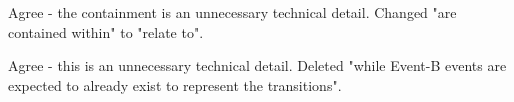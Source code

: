 \documentclass{response}
\begin{document}
\begin{comment}{Reviewer \#3}
  Page 2:
  
  * Second paragraph appears complicated writing.
\end{comment}

\begin{response}
\end{response}

\begin{comment}{Reviewer \#3}
  Page 3:

* Listing 1: I think I would name that variable "run2completion" differently.
\end{comment}

\begin{response}
\end{response}


\begin{comment}{Reviewer \#3}
  Page 4:

  * Mid, it is not clear what this means:

  "The diagrammatic models are contained within an Event-B machine"
\end{comment}

\begin{response}
	Agree - the containment is an unnecessary technical detail. Changed "are contained within" to "relate to".
\end{response}

\begin{comment}{Reviewer \#3}
Page 4:
  and this as well:

 "while Event-B events are expected to already exist to represent the transitions."
\end{comment}

\begin{response}
	Agree - this is an unnecessary technical detail. Deleted  "while Event-B events are expected to already exist to represent the transitions".
\end{response}

\begin{comment}{Reviewer \#3}
  Page 5:

  * It would seem more natural to have one state variable ranging over
  an enumerated type of states, rather than having a Boolean flag for
  each state.
\end{comment}
  
\end{document}
